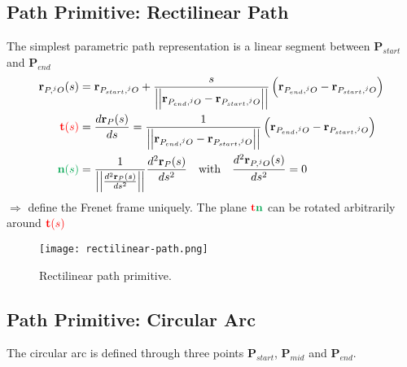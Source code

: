 \subsection{Path Primitive: Rectilinear Path}
The simplest parametric path representation is a linear segment between $\textbf{P}_{start}$ and $\textbf{P}_{end}$
\begin{align}
	\textbf{r}_{P,\prescript{j}{}{O}}(s) &= \textbf{r}_{P_{start}, \prescript{j}{}{O}} + \frac{s}{\left|\left| \textbf{r}_{P_{end}, \prescript{j}{}{O}} - \textbf{r}_{P_{start}, \prescript{j}{}{O}} \right|\right|} \left( \textbf{r}_{P_{end}, \prescript{j}{}{O}} - \textbf{r}_{P_{start}, \prescript{j}{}{O}} \right)\\
	{\color{red} \textbf{t}(s)} &= \frac{d\textbf{r}_P(s)}{ds} = \frac{1}{\left|\left| \textbf{r}_{P_{end}, \prescript{j}{}{O}} - \textbf{r}_{P_{start}, \prescript{j}{}{O}} \right|\right|} \left( \textbf{r}_{P_{end}, \prescript{j}{}{O}} - \textbf{r}_{P_{start}, \prescript{j}{}{O}} \right)\\
	{\color{Green} \textbf{n}(s)} &= \frac{1}{\left|\left| \frac{d^2 \textbf{r}_P(s)}{ds^2} \right| \right|} \frac{d^2 \textbf{r}_P(s)}{ds^2} \quad\text{with}\quad \frac{d^2 \textbf{r}_{P,\prescript{j}{}{O}}(s)}{ds^2}=0
\end{align}
$\Rightarrow$  define the Frenet frame uniquely. The plane ${\color{red}\textbf{t}\color{Green}\textbf{n}}$ can be rotated arbitrarily around ${\color{red} \textbf{t}(s)}$

\begin{figure}[hbt!]
	\centering
	\texttt{[image: rectilinear-path.png]}
	\caption{Rectilinear path primitive.}
	\label{fig:rectilinear-path}
\end{figure}

\subsection{Path Primitive: Circular Arc}
The circular arc is defined through three points $\textbf{P}_{start}$, $\textbf{P}_{mid}$ and $\textbf{P}_{end}$.

